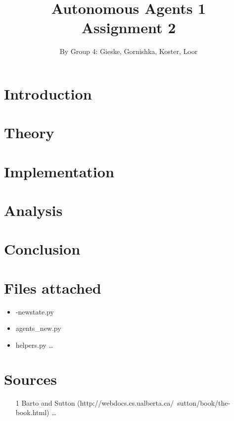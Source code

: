 \documentclass{article}
\begin{document}
\title{Autonomous Agents 1 \\ Assignment 2}

\author{By Group 4: Gieske, Gornishka, Koster, Loor}
\maketitle

\pagebreak

\section*{Introduction}

\pagebreak

\section*{Theory}

\pagebreak

\section*{Implementation}

\section*{Analysis}


\section*{Conclusion}

\section*{Files attached}
\begin{itemize}
\item -newstate.py
\item agents\_new.py
\item helpers.py \ldots
\end{itemize}
\section*{Sources}

\begin{itemize}
	\item [1] Barto and Sutton (http://webdocs.cs.ualberta.ca/~sutton/book/the-book.html) \ldots
\end{itemize}
\end{document}
